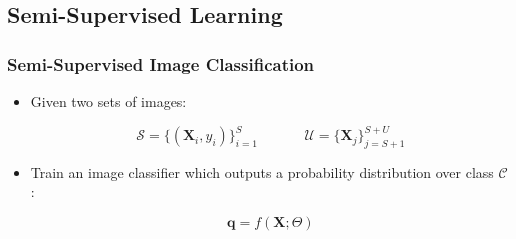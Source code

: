 \subsection{Semi-Supervised Learning}

\begin{frame}
	\frametitle{Semi-Supervised Image Classification}
	\begin{itemize}
		\item Given two sets of images:
			\begin{block}{}
				\setlength\abovedisplayskip{0pt}
				\begin{equation*}
					\mathcal{S} = \{(\mathbf{X}_i, y_i)\}_{i=1}^S~~~~~~~~~~~~~~~ \mathcal{U} = \{\mathbf{X}_j\}_{j=S+1}^{S+U}
				\end{equation*}
			\end{block}
		\item Train an image classifier which outputs a probability distribution over class
			$\mathcal{C}$:
			\begin{block}{}
				\begin{equation*}
					\mathbf{q} = f(\mathbf{X}; \Theta)
				\end{equation*}
			\end{block}
	\end{itemize}
\end{frame}

